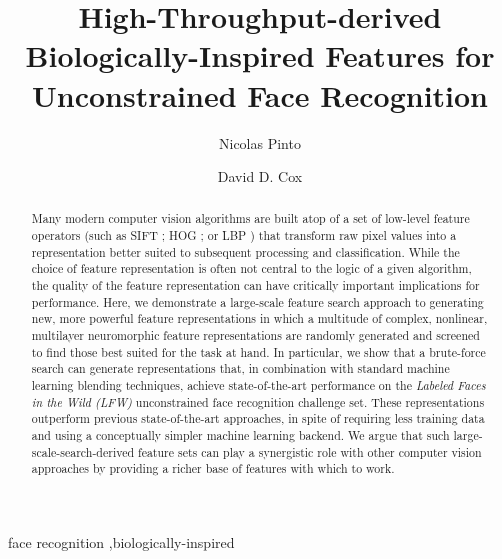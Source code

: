 \documentclass[preprint, 12pt]{elsarticle}
\begin{document}
\begin{frontmatter}

\title{
High-Throughput-derived Biologically-Inspired Features for Unconstrained Face Recognition
}

\author[rowland,mit]{Nicolas Pinto}

\author[rowland]{David D. Cox}

\address[rowland]{The Rowland Institute at Harvard, Harvard University, Cambridge, MA 02142}
\address[mit]{McGovern Institute for Brain Research at MIT, Cambridge, MA 02139}


\begin{abstract}
Many modern computer vision algorithms are built atop of a set of low-level
feature operators (such as SIFT \cite{sift,luo2007person}; HOG \cite{dalal2005hog,albiol2008face}; or LBP
\cite{ahonen2004face,ahonen2006face}) that transform raw pixel values into a representation better
suited to subsequent processing and classification.  While the choice of feature
representation is often not central to the logic of a given algorithm, the
quality of the feature representation can have critically important implications
for performance.  Here, we demonstrate a large-scale feature search approach to
generating new, more powerful feature representations in which a multitude of
complex, nonlinear, multilayer neuromorphic feature representations are randomly
generated and screened to find those best suited for the task at hand.  In
particular, we show that a brute-force search can generate representations that,
in combination with standard machine learning blending techniques, achieve
state-of-the-art performance on the \emph{Labeled Faces in the Wild (LFW)} \cite{huang:lfw}
unconstrained face recognition challenge set.  These representations outperform
previous state-of-the-art approaches, in spite of requiring less training data
and using a conceptually simpler machine learning backend.  We argue that such
large-scale-search-derived feature sets can play a synergistic role with other
computer vision approaches by providing a richer base of features with which to
work.

\end{abstract}

\begin{keyword}
face recognition \sep biologically-inspired
\end{keyword}

\end{frontmatter}
\end{document}
